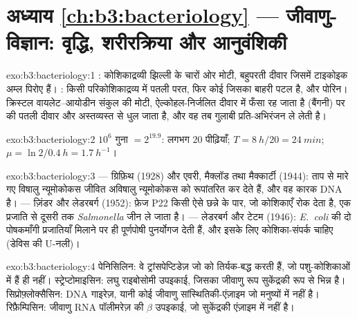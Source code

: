 \section*{अध्याय \ref{ch:b3:bacteriology} --- जीवाणु-विज्ञान: वृद्धि, शरीरक्रिया और आनुवंशिकी}

\begin{solution}{exo:b3:bacteriology:1}
: कोशिकाद्रव्यी झिल्ली के चारों ओर मोटी, बहुपरती
 दीवार जिसमें टाइकोइक अम्ल पिरोए हैं। :
किसी परिकोशिकाद्रव्य में पतली  परत, फिर कोई  जिसका बाहरी पटल  है, और पोरिन। क्रिस्टल
वायलेट--आयोडीन संकुल  की मोटी, ऐल्कोहल-निर्जलित दीवार में
फँसा रह जाता है (बैंगनी) पर  की पतली दीवार और अस्तव्यस्त
 से धुल जाता है, और वह तब गुलाबी प्रति-अभिरंजन ले लेती है।
\end{solution}

\begin{solution}{exo:b3:bacteriology:2}
$10^{6}$ गुना $= 2^{19.9}$: लगभग $20$ पीढ़ियाँ; $T = \qty{8}{h}/20
= \qty{24}{min}$; $\mu = \ln 2/\qty{0.4}{h} = \qty{1.7}{h^{-1}}$।
\end{solution}

\begin{solution}{exo:b3:bacteriology:3}
 --- ग्रिफ़िथ (1928) और एवरी, मैक्लॉड तथा मैक्कार्टी
(1944): ताप से मारे गए विषालु न्यूमोकोकस जीवित अविषालु न्यूमोकोकस को
रूपांतरित कर देते हैं, और वह कारक DNA है।  --- ज़िंडर और लेडरबर्ग
(1952): फ़ेज P22 किसी ऐसे छन्ने के पार, जो कोशिकाएँ रोक देता है, एक
प्रजाति से दूसरी तक \emph{Salmonella} जीन ले जाता है।  ---
लेडरबर्ग और टेटम (1946): \emph{E.~coli} की दो पोषकमाँगी प्रजातियाँ
मिलाने पर ही पूर्णपोषी पुनर्योगज देती हैं, और इसके लिए कोशिका-संपर्क
चाहिए (डेविस की U-नली)।
\end{solution}

\begin{solution}{exo:b3:bacteriology:4}
पेनिसिलिन: वे ट्रांसपेप्टिडेज़ जो  को तिर्यक-बद्ध करती
हैं, जो पशु-कोशिकाओं में हैं ही नहीं। स्ट्रेप्टोमाइसिन: लघु राइबोसोमी
उपइकाई, जिसका जीवाणु रूप सुकेंद्रकी रूप से भिन्न है। सिप्रोफ़्लोक्सैसिन:
DNA गाइरेज़, यानी कोई जीवाणु सांस्थितिकी-एंज़ाइम जो मनुष्यों में नहीं
है। रिफ़ैम्पिसिन: जीवाणु RNA पॉलीमरेज़ की $\beta$ उपइकाई, जो सुकेंद्रकी
एंज़ाइम में नहीं है।
\end{solution}

